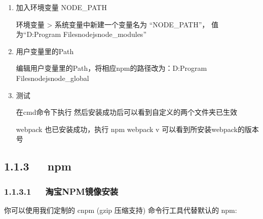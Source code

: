 \documentclass[letterpaper,12pt,english]{sphinxmanual}
\begin{document}
\begin{sphinxVerbatim}[commandchars=\\\{\}]
    
    
\end{sphinxVerbatim}
\begin{enumerate}
%
\setcounter{enumi}{1}
\item {} 
加入环境变量 NODE\_PATH

环境变量 \sphinxhyphen{}> 系统变量中新建一个变量名为 “NODE\_PATH”， 值为“D:Program Filesnodejsnode\_modules”

\item {} 
用户变量里的Path

编辑用户变量里的Path，将相应npm的路径改为：D:Program Filesnodejsnode\_global

\item {} 
测试

在cmd命令下执行  然后安装成功后可以看到自定义的两个文件夹已生效

webpack 也已安装成功，执行 npm webpack \sphinxhyphen{}v 可以看到所安装webpack的版本号

\end{enumerate}


\subsection{1.1.3   npm}
\label{\detokenize{001software/001install/001._u7f51_u7ad9/nodeJs:npm}}

\subsubsection{1.1.3.1   淘宝NPM镜像安装}
\label{\detokenize{001software/001install/001._u7f51_u7ad9/nodeJs:id3}}

你可以使用我们定制的 cnpm (gzip 压缩支持) 命令行工具代替默认的 npm:
\end{document}
